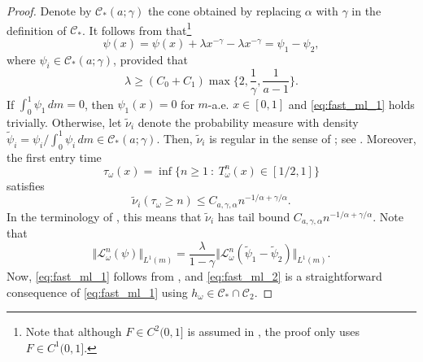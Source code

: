 \documentclass[12pt,reqno,a4paper]{article}
\newcommand\cL{{\mathcal L}}
\newcommand\cC{{\mathcal C}}
\begin{document}
	
	\begin{proof} Denote by $\cC_*(a; \gamma)$ the cone 
		obtained by replacing $\alpha$ with $\gamma$ in the definition of $\mathcal C_*$.
		It follows from \cite[Lemma 3]{DGTS} that\footnote{Note that
			although $F \in C^2(0,1]$ is assumed in \cite[Lemma 3]{DGTS}, 
			the proof only uses $F \in C^1(0,1]$.
		}
		$$
		\psi(x) = \psi(x) + \lambda x^{- \gamma} -  \lambda x^{- \gamma} = \psi_{1} - \psi_{ 2},
		$$
		where $\psi_{i} \in \cC_*(a; \gamma)$, provided that 
		$$
		\lambda \ge ( C_{0} + C_{1}  ) \max \biggl\{ 
		2, \frac{1}{\gamma}, \frac{1}{a - 1}
		\biggr\}.
		$$
		If $\int_0^1 \psi_{ 1} \, dm = 0$, then $\psi_1(x) = 0$ for $m$-a.e. $x \in [0,1]$ and 
		\eqref{eq:fast_ml_1} holds trivially. Otherwise, 
		let $\tilde{\nu}_{i}$ denote the probability measure with density $\tilde{\psi}_{ i} = \psi_{ i} / \int_0^1 \psi_{ i} \, dm \in \cC_*(a; \gamma)$.
		Then, $\tilde{\nu}_{i}$ is regular in the sense 
		of \cite[Definition 3.5]{KL}; see \cite[Proposition 3.14]{KL}. Moreover, the first entry time
		$$
		\tau_\omega(x) = \inf \{  n \ge 1 \: : \:  T_\omega^n(x)  \in [1/2,1] \}
		$$
		satisfies 
		$$
		\tilde{\nu}_{i}( \tau_\omega \ge n ) \le C_{a, \gamma, \alpha} n^{- 1 / \alpha + \gamma / \alpha}.
		$$
		In the terminology of \cite{KL}, this means that $\tilde{\nu}_{i}$ has tail bound 
		$C_{a,\gamma, \alpha} n^{- 1 / \alpha + \gamma / \alpha}$. Note that
		$$
		\Vert \cL_\omega^n (  \psi ) \Vert_{L^1(m)}
		=  \frac{\lambda}{ 1 -\gamma} \Vert \cL_\omega^n (   \tilde{\psi}_{ 1} -    \tilde{\psi}_{ 2}   ) \Vert_{L^1(m)}.
		$$
		Now, \eqref{eq:fast_ml_1} follows  from \cite[Theorem 3.8]{KL}, and 
		\eqref{eq:fast_ml_2} is a straightforward consequence 
		of \eqref{eq:fast_ml_1} using $h_\omega \in \cC_* \cap \cC_2$.
	\end{proof}
	
	
	
\end{document}
